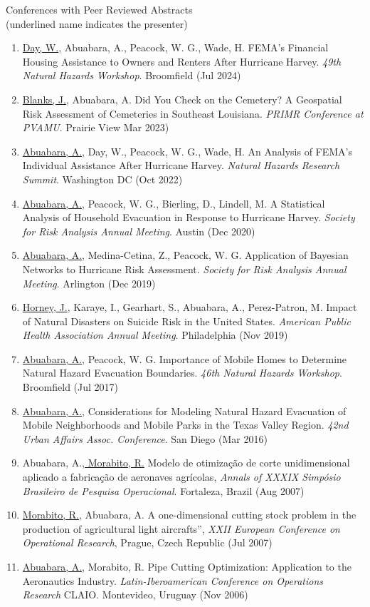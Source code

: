 \documentclass[11pt,oneside]{article}
\begin{document}
{Conferences with Peer Reviewed Abstracts}\\{\small (underlined name indicates the presenter)}
\begin{enumerate}[leftmargin=20pt]
\item \underline{Day, W.}, Abuabara, A., Peacock, W. G., Wade, H. FEMA's Financial Housing Assistance to Owners and Renters After Hurricane Harvey. \emph{49th Natural Hazards Workshop}. Broomfield (Jul 2024)
\item \underline{Blanks, J.}, Abuabara, A. Did You Check on the Cemetery? A Geospatial Risk Assessment of Cemeteries in Southeast Louisiana. \emph{PRIMR Conference at PVAMU}. Prairie View Mar 2023)
\item \underline{Abuabara, A.}, Day, W., Peacock, W. G., Wade, H. An Analysis of FEMA's Individual Assistance After Hurricane Harvey. \emph{Natural Hazards Research Summit}. Washington DC (Oct 2022)
\item \underline{Abuabara, A.}, Peacock, W. G., Bierling, D., Lindell, M. A Statistical Analysis of Household Evacuation in Response to Hurricane Harvey. \emph{Society for Risk Analysis Annual Meeting}. Austin (Dec 2020)
\item \underline{Abuabara, A.}, Medina-Cetina, Z., Peacock, W. G. Application of Bayesian Networks to Hurricane Risk Assessment. \emph{Society for Risk Analysis Annual Meeting}. Arlington (Dec 2019)
\item \underline{Horney, J.}, Karaye, I., Gearhart, S., Abuabara, A., Perez-Patron, M. Impact of Natural Disasters on Suicide Risk in the United States. \emph{American Public Health Association Annual Meeting}. Philadelphia (Nov 2019)
\item \underline{Abuabara, A.}, Peacock, W. G. Importance of Mobile Homes to Determine Natural Hazard Evacuation Boundaries. \emph{46th Natural Hazards Workshop}. Broomfield (Jul 2017)
\item \underline{Abuabara, A.}, Considerations for Modeling Natural Hazard Evacuation of Mobile Neighborhoods and Mobile Parks in the Texas Valley Region. \emph{42nd Urban Affairs Assoc. Conference}. San Diego (Mar 2016)
\item Abuabara, A.,\underline{ Morabito, R.} Modelo de otimização de corte unidimensional aplicado a fabricação de aeronaves agrícolas, \emph{Annals of XXXIX Simpósio Brasileiro de Pesquisa Operacional}. Fortaleza, Brazil (Aug 2007)
\item \underline{Morabito, R.}, Abuabara, A. A one-dimensional cutting stock problem in the production of agricultural light aircrafts”, \emph{XXII European Conference on Operational Research}, Prague, Czech Republic (Jul 2007)
\item \underline{Abuabara, A.}, Morabito, R. Pipe Cutting Optimization: Application to the Aeronautics Industry. \emph{Latin-Iberoamerican Conference on Operations Research} CLAIO. Montevideo, Uruguay (Nov 2006)
\end{enumerate}
\end{document}
